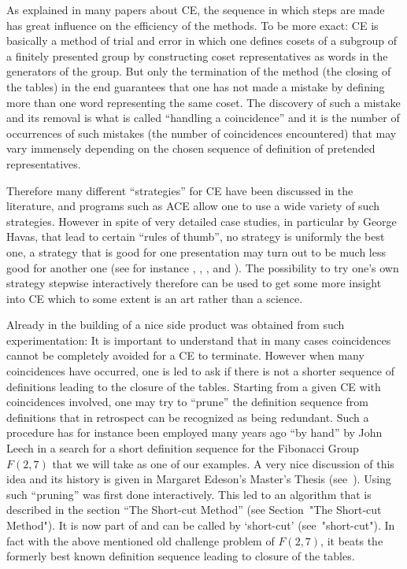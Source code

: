 As explained in many papers about CE, the sequence in which steps are
made has great influence on the efficiency of the methods. To be more
exact: CE is basically a method of trial and error in which one
defines cosets of a subgroup of a finitely presented group by
constructing coset representatives as words in the generators of the
group. But only the termination
of the method (the closing of the tables) in the end guarantees that
one has not made a mistake by defining more than one word representing
the same coset. The discovery of such a mistake and its removal is
what is called ``handling a coincidence'' and it is the number of
occurrences of such mistakes (the number of coincidences encountered)
that may vary immensely depending on the chosen sequence of definition
of pretended representatives.

Therefore many different ``strategies'' for CE have been discussed in
the literature, and programs such as ACE allow one to use a wide
variety of such strategies. However in spite of very detailed case
studies, in particular by George Havas, that lead to certain ``rules of
thumb'', no strategy is uniformly the best one, a strategy that is good
for one presentation may turn out to be much less good for another one
(see for instance \cite{CDHW73}, \cite{Hav91}, \cite{HR99a},
and \cite{HR99b}). The
possibility to try one's own strategy stepwise interactively therefore
can be used to get some more insight into CE which to some extent is
an art rather than a science.

Already in the building of {\ITC} a nice side product was obtained
from such experimentation: It is important to understand that in many
cases coincidences cannot be completely avoided for a CE to terminate.
However when many coincidences have occurred, one is led to ask if
there is not a shorter sequence of definitions leading to the closure
of the tables. Starting from a given CE with coincidences involved,
one may try to ``prune'' the definition sequence from definitions that
in retrospect can be recognized as being redundant. Such a procedure
has for instance been employed many years ago ``by hand'' by John Leech
in a search for a short definition sequence for the Fibonacci Group
$F(2,7)$ that we will take as one of our examples. A very nice
discussion of this idea and its history is given in Margaret Edeson's
Master's Thesis (see~\cite{Ede89}). Using {\ITC} such ``pruning'' was
first done interactively. This led to an algorithm that is described
in the section ``The Short-cut Method'' (see Section~"The Short-cut
Method"). It is now part of {\ITC} and can be called by `short-cut'
(see~"short-cut"). In fact with the above mentioned old challenge
problem of $F(2,7)$, it beats the formerly best known definition
sequence leading to closure of the tables.

